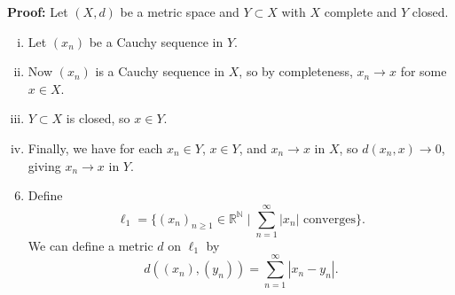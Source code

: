 \documentclass[12pt]{article}
\theoremstyle{definition}
\theoremstyle{remark}
\begin{document}
\begin{adjustbox}{minipage = \columnwidth - 25.5pt, margin=1em, frame=1pt, margin=0em}
	\textbf{Proof:} Let $(X, d)$ be a metric space and $Y \subset X$ with $X$ complete and $Y$ closed.
	\begin{enumerate}[(i)]
		\item Let $(x_n)$ be a Cauchy sequence in $Y$.
		\item Now $(x_n)$ is a Cauchy sequence in $X$, so by completeness, $x_n \to x$ for some $x \in X$.
		\item $Y \subset X$ is closed, so $x \in Y$.
		\item Finally, we have for each $x_n \in Y$, $x \in Y$, and $x_n \to x$ in $X$, so $d(x_n, x) \to 0$, giving $x_n \to x$ in $Y$.
	\end{enumerate}
	
\end{adjustbox}

\begin{adjustbox}{minipage = \columnwidth - 25.5pt, margin=1em, frame=1pt, margin=0em}
\begin{enumerate}[1.]
	\setcounter{enumi}{5}
\item Define
	\[
		\ell_1 = \biggl\{(x_n)_{n \geq 1} \in \mathbb{R}^{\mathbb{N}} \mid \sum_{n = 1}^{\infty} |x_n| \text{ converges} \biggr\}
	.\]
	We can define a metric $d$ on $\ell_1$ by
	\[
		d((x_n), (y_n)) = \sum_{n = 1}^{\infty} |x_n - y_n|
	.\]

\end{enumerate}

\end{adjustbox}
\end{document}
